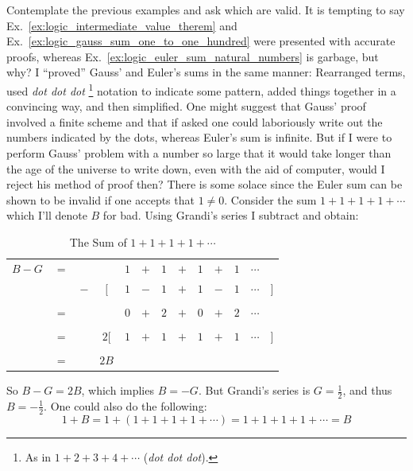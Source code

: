     Contemplate the previous examples and ask which are valid. It is tempting to
    say Ex.~\ref{ex:logic_intermediate_value_therem} and
    Ex.~\ref{ex:logic_gauss_sum_one_to_one_hundred} were presented
    with accurate proofs, whereas
    Ex.~\ref{ex:logic_euler_sum_natural_numbers} is garbage, but
    why? I ``proved'' Gauss' and Euler's sums in the same manner: Rearranged
    terms, used \textit{dot dot dot}%
    \footnote{
        As in $1+2+3+4+\cdots$ (\textit{dot dot dot}).
    }
    notation to indicate some pattern, added things together in a convincing
    way, and then simplified. One might suggest that Gauss' proof involved a
    finite scheme and that if asked one could laboriously write out the numbers
    indicated by the dots, whereas Euler's sum is infinite. But if I were to
    perform Gauss' problem with a number so large that it would take longer than
    the age of the universe to write down, even with the aid of computer, would
    I reject his method of proof then? There is some solace since the Euler sum
    can be shown to be invalid if one accepts that $1\ne{0}$. Consider the sum
    $1+1+1+1+\cdots$ which I'll denote $B$ for bad. Using Grandi's series I
    subtract and obtain:
    \begin{table}[H]
        \centering
        \captionsetup{type=table}
        \begin{tabular}{ccccccccccccc}
            $B-G$&$=$&&       &$1$&$+$&$1$&$+$&$1$&$+$&$1$&$\cdots$\\
                 &&$-$&$\Big[$&$1$&$-$&$1$&$+$&$1$&$-$&$1$&$\cdots$&$\Big]$
            \\[1ex]
            \hline\\
                 &$=$&&&$0$&$+$&$2$&$+$&$0$&$+$&$2$&$\cdots$\\[1ex]
            \hline\\
            &$=$&&$2\Big[$&$1$&$+$&$1$&$+$&$1$&$+$&$1$&$\cdots$&$\Big]$
                \\[1ex]
            \hline\\
            &$=$&&$2B$
        \end{tabular}
        \caption{The Sum of $1+1+1+1+\cdots$}
    \end{table}
    So $B-G=2B$, which implies $B=\minus{G}$. But Grandi's series is
    $G=\frac{1}{2}$, and thus $B=\minus\frac{1}{2}$. One could also do the
    following:
    \begin{equation}
        1+B=1+(1+1+1+1+\cdots)=1+1+1+1+\cdots=B
    \end{equation}
